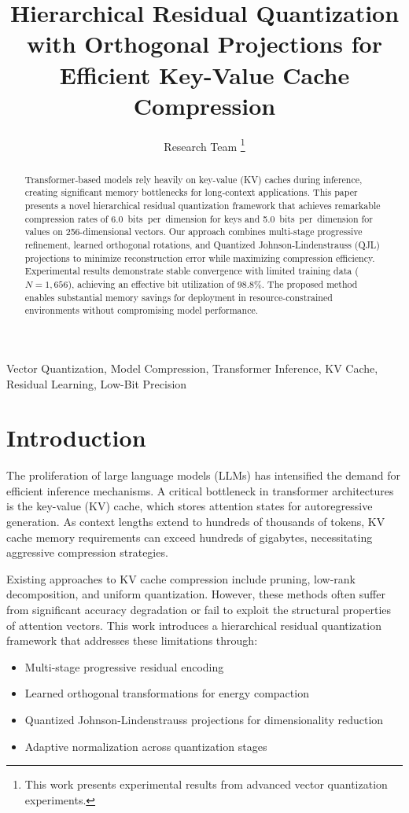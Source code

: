 \documentclass[10pt,conference]{ieeeconf}
\title{\LARGE \bf
Hierarchical Residual Quantization with Orthogonal Projections for Efficient Key-Value Cache Compression
}
\author{Research Team
\thanks{This work presents experimental results from advanced vector quantization experiments.}
}
\begin{document}
\maketitle

\begin{abstract}
Transformer-based models rely heavily on key-value (KV) caches during inference, creating significant memory bottlenecks for long-context applications. This paper presents a novel hierarchical residual quantization framework that achieves remarkable compression rates of \SI{6.0}{bits per dimension} for keys and \SI{5.0}{bits per dimension} for values on 256-dimensional vectors. Our approach combines multi-stage progressive refinement, learned orthogonal rotations, and Quantized Johnson-Lindenstrauss (QJL) projections to minimize reconstruction error while maximizing compression efficiency. Experimental results demonstrate stable convergence with limited training data ($N=1,656$), achieving an effective bit utilization of 98.8\%. The proposed method enables substantial memory savings for deployment in resource-constrained environments without compromising model performance.
\end{abstract}

\begin{keywords}
Vector Quantization, Model Compression, Transformer Inference, KV Cache, Residual Learning, Low-Bit Precision
\end{keywords}

\section{Introduction}
The proliferation of large language models (LLMs) has intensified the demand for efficient inference mechanisms. A critical bottleneck in transformer architectures is the key-value (KV) cache, which stores attention states for autoregressive generation. As context lengths extend to hundreds of thousands of tokens, KV cache memory requirements can exceed hundreds of gigabytes, necessitating aggressive compression strategies.

Existing approaches to KV cache compression include pruning, low-rank decomposition, and uniform quantization. However, these methods often suffer from significant accuracy degradation or fail to exploit the structural properties of attention vectors. This work introduces a hierarchical residual quantization framework that addresses these limitations through:

\begin{itemize}
    \item Multi-stage progressive residual encoding
    \item Learned orthogonal transformations for energy compaction
    \item Quantized Johnson-Lindenstrauss projections for dimensionality reduction
    \item Adaptive normalization across quantization stages
\end{itemize}
\end{document}
